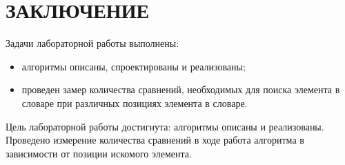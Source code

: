 \chapter*{ЗАКЛЮЧЕНИЕ}

Задачи лабораторной работы выполнены:

\begin{itemize}[label=--]
    \item алгоритмы описаны, спроектированы и реализованы;
    \item проведен замер количества сравнений, необходимых для поиска элемента в словаре при различных позициях элемента в словаре.

\end{itemize}

Цель лабораторной работы достигнута: алгоритмы описаны и реализованы. Проведено измерение количества сравнений в ходе работа алгоритма в зависимости от позиции искомого элемента.
